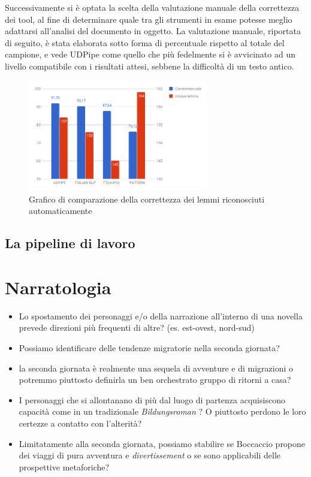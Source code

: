 Successivamente si è optata la scelta della valutazione manuale della
correttezza dei tool, al fine di determinare quale tra gli strumenti in
esame potesse meglio adattarsi all'analisi del documento in oggetto. La
valutazione manuale, riportata di seguito, è stata elaborata sotto forma
di percentuale rispetto al totale del campione, e vede UDPipe come
quello che più fedelmente si è avvicinato ad un livello compatibile con
i risultati attesi, sebbene la difficoltà di un testo antico.

\begin{figure}
\centering
\includegraphics[width=0.70000\textwidth]{../charts/correctnessLib-Lemma.png}
\caption{Grafico di comparazione della correttezza dei lemmi
riconosciuti automaticamente}
\end{figure}

\subsection{La pipeline di lavoro}\label{la-pipeline-di-lavoro}

\section{Narratologia}\label{narratologia}

\begin{itemize}
\tightlist
\item
  Lo spostamento dei personaggi e/o della narrazione all'interno di una
  novella prevede direzioni più frequenti di altre? (es. est-ovest,
  nord-sud)
\item
  Possiamo identificare delle tendenze migratorie nella seconda
  giornata?
\item
  la seconda giornata è realmente una sequela di avventure e di
  migrazioni o potremmo piuttosto definirla un ben orchestrato gruppo di
  ritorni a casa?
\item
  I personaggi che si allontanano di più dal luogo di partenza
  acquisiscono capacità come in un tradizionale \emph{Bildungsroman} ? O
  piuttosto perdono le loro certezze a contatto con l'alterità?
\item
  Limitatamente alla seconda giornata, possiamo stabilire se Boccaccio
  propone dei viaggi di pura avventura e \emph{divertissement} o se sono
  applicabili delle prospettive metaforiche?
\end{itemize}

